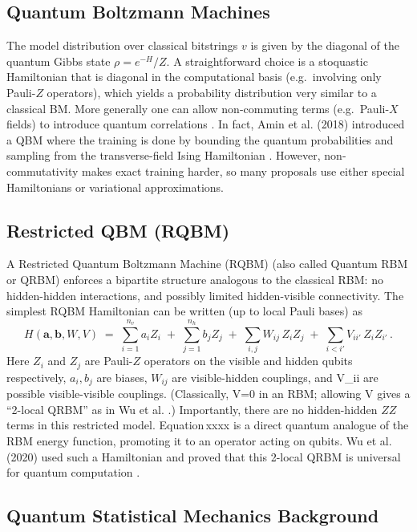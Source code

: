 \documentclass[%
oneside,                 %
final,                   %
10pt]{article}
\begin{document}
\subsection*{Quantum Boltzmann Machines}

The model distribution over
classical bitstrings $v$ is given by the diagonal of the quantum Gibbs
state $\rho = e^{-H}/Z$.  A straightforward choice is a stoquastic
Hamiltonian that is diagonal in the computational basis
(e.g.~involving only Pauli-$Z$ operators), which yields a probability
distribution very similar to a classical BM.  More generally one can
allow non-commuting terms (e.g.~Pauli-$X$ fields) to introduce quantum
correlations .  In fact, Amin et al. (2018) introduced a QBM where the
training is done by bounding the quantum probabilities and sampling
from the transverse-field Ising Hamiltonian .  However,
non-commutativity makes exact training harder, so many proposals use
either special Hamiltonians or variational approximations.

\subsection*{Restricted QBM (RQBM)}

A Restricted Quantum Boltzmann Machine (RQBM) (also called Quantum RBM
or QRBM) enforces a bipartite structure analogous to the classical
RBM: no hidden-hidden interactions, and possibly limited
hidden-visible connectivity.  The simplest RQBM Hamiltonian can be
written (up to local Pauli bases) as
\[
H(\mathbf{a},\mathbf{b},W,V) \;=\; \sum_{i=1}^{n_v} a_i Z_i \;+\; \sum_{j=1}^{n_h} b_j Z_j \;+\; \sum_{i,j} W_{ij}\, Z_i Z_j \;+\; \sum_{i<i{\prime}} V_{ii{\prime}}\, Z_i Z_{i{\prime}} \,.
\]
Here $Z_i$ and $Z_j$ are Pauli-$Z$ operators on the visible and hidden
qubits respectively, $a_i,b_j$ are biases, $W_{ij}$ are visible-hidden
couplings, and V_{ii{\prime}} are possible visible-visible couplings.
(Classically, V=0 in an RBM; allowing V gives a “2-local QRBM” as
in Wu et al. .)  Importantly, there are no hidden-hidden $ZZ$ terms in
this restricted model.  Equation xxxx  is a
direct quantum analogue of the RBM energy function, promoting it to an
operator acting on qubits.  Wu et al. (2020) used such a Hamiltonian
and proved that this 2-local QRBM is universal for quantum computation
.

\subsection*{Quantum Statistical Mechanics Background}
\end{document}
